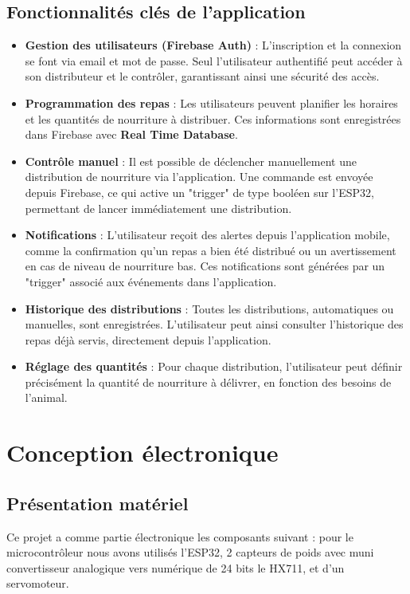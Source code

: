 \section{Fonctionnalités clés de l’application} 
\begin{itemize}
	\item \textbf{Gestion des utilisateurs (Firebase Auth)} : 
	L'inscription et la connexion se font via email et mot de passe. Seul l’utilisateur authentifié peut accéder à son distributeur et le contrôler, garantissant ainsi une sécurité des accès.

	\item \textbf{Programmation des repas} :
	Les utilisateurs peuvent planifier les horaires et les quantités de nourriture à distribuer. Ces informations sont enregistrées dans Firebase avec \textbf{Real Time Database}.

	\item \textbf{Contrôle manuel} :
	Il est possible de déclencher manuellement une distribution de nourriture via l’application. Une commande est envoyée depuis Firebase, ce qui active un "trigger" de type booléen sur l’ESP32, permettant de lancer immédiatement une distribution.

	\item \textbf{Notifications} :
	L’utilisateur reçoit des alertes depuis l’application mobile, comme la confirmation qu’un repas a bien été distribué ou un avertissement en cas de niveau de nourriture bas. Ces notifications sont générées par un "trigger" associé aux événements dans l’application.

	\item \textbf{Historique des distributions} :
	Toutes les distributions, automatiques ou manuelles, sont enregistrées. L’utilisateur peut ainsi consulter l’historique des repas déjà servis, directement depuis l’application.

	\item \textbf{Réglage des quantités} :
	Pour chaque distribution, l’utilisateur peut définir précisément la quantité de nourriture à délivrer, en fonction des besoins de l’animal.
\end{itemize}


\pagestyle{fancy}
\fancyhead{} %
\chapter{Conception électronique}
\section{Présentation matériel}
Ce projet a comme partie électronique les composants suivant : pour le microcontrôleur nous avons utilisés l'ESP32, 2 capteurs de poids avec muni convertisseur analogique vers numérique de 24 bits le HX711, et d'un servomoteur.

